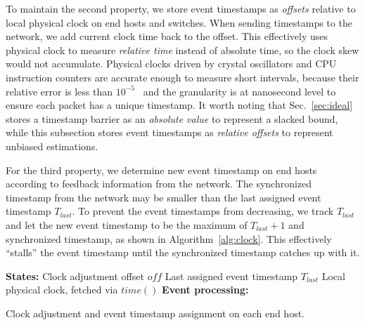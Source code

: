 To maintain the second property, we store event timestamps as \textit{offsets} relative to local physical clock on end hosts and switches. When sending timestamps to the network, we add current clock time back to the offset.
This effectively uses physical clock to measure \textit{relative time} instead of absolute time, so the clock skew would not accumulate. Physical clocks driven by crystal oscillators and CPU instruction counters are accurate enough to measure short intervals, because their relative error is less than $10^{-5}$~\cite{corbett2013spanner} and the granularity is at nanosecond level to ensure each packet has a unique timestamp.
It worth noting that Sec.~\ref{sec:ideal} stores a timestamp barrier as an \textit{absolute value} to represent a slacked bound, while this subsection stores event timestamps as \textit{relative offsets} to represent unbiased estimations.

For the third property, we determine new event timestamp on end hosts according to feedback information from the network.
The synchronized timestamp from the network may be smaller than the last assigned event timestamp $T_{last}$. To prevent the event timestamps from decreasing, we track $T_{last}$ and let the new event timestamp to be the maximum of $T_{last} + 1$ and synchronized timestamp, as shown in Algorithm~\ref{alg:clock}. This effectively ``stalls'' the event timestamp until the synchronized timestamp catches up with it.

\begin{algorithm}[t]
 \DontPrintSemicolon
 \textbf{States:} Clock adjustment offset $off$\;
 \qquad Last assigned event timestamp $T_{last}$\;
 \qquad Local physical clock, fetched via $time()$\;
 \textbf{Event processing:}\;
 \caption{Clock adjustment and event timestamp assignment on each end host.}
 \label{alg:clock}
\end{algorithm}


